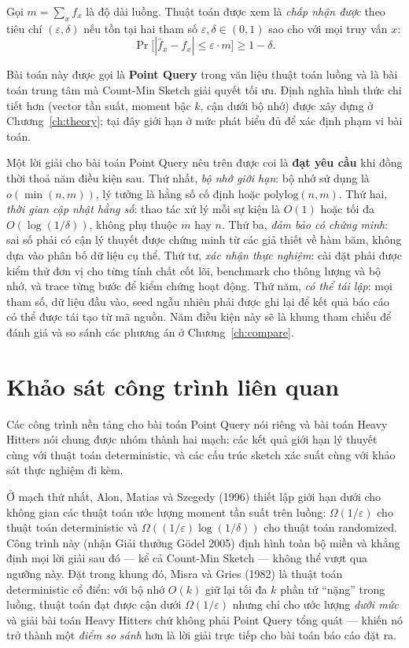 Gọi $m = \sum_x f_x$ là độ dài luồng. Thuật toán được xem là \textit{chấp nhận được} theo tiêu chí $(\varepsilon, \delta)$ nếu tồn tại hai tham số $\varepsilon, \delta \in (0, 1)$ sao cho với mọi truy vấn $x$:
\begin{equation}
\Pr\bigl[|\hat{f}_x - f_x| \le \varepsilon \cdot m\bigr] \ge 1 - \delta.
\label{eq:point-query-acceptance}
\end{equation}

Bài toán này được gọi là \textbf{Point Query} trong văn liệu thuật toán luồng và là bài toán trung tâm mà Count-Min Sketch \cite{cormode2005cms} giải quyết tối ưu. Định nghĩa hình thức chi tiết hơn (vector tần suất, moment bậc $k$, cận dưới bộ nhớ) được xây dựng ở Chương~\ref{ch:theory}; tại đây giới hạn ở mức phát biểu đủ để xác định phạm vi bài toán.

Một lời giải cho bài toán Point Query nêu trên được coi là \textbf{đạt yêu cầu} khi đồng thời thoả năm điều kiện sau. Thứ nhất, \textit{bộ nhớ giới hạn}: bộ nhớ sử dụng là $o(\min(n, m))$, lý tưởng là hằng số cố định hoặc $\mathrm{polylog}(n, m)$. Thứ hai, \textit{thời gian cập nhật hằng số}: thao tác xử lý mỗi sự kiện là $O(1)$ hoặc tối đa $O(\log(1/\delta))$, không phụ thuộc $m$ hay $n$. Thứ ba, \textit{đảm bảo có chứng minh}: sai số phải có cận lý thuyết được chứng minh từ các giả thiết về hàm băm, không dựa vào phân bố dữ liệu cụ thể. Thứ tư, \textit{xác nhận thực nghiệm}: cài đặt phải được kiểm thử đơn vị cho từng tính chất cốt lõi, benchmark cho thông lượng và bộ nhớ, và trace từng bước để kiểm chứng hoạt động. Thứ năm, \textit{có thể tái lập}: mọi tham số, dữ liệu đầu vào, seed ngẫu nhiên phải được ghi lại để kết quả báo cáo có thể được tái tạo từ mã nguồn. Năm điều kiện này sẽ là khung tham chiếu để đánh giá và so sánh các phương án ở Chương~\ref{ch:compare}.

\section{Khảo sát công trình liên quan}
\label{sec:related-work}

Các công trình nền tảng cho bài toán Point Query nói riêng và bài toán Heavy Hitters nói chung được nhóm thành hai mạch: các kết quả giới hạn lý thuyết cùng với thuật toán deterministic, và các cấu trúc sketch xác suất cùng với khảo sát thực nghiệm đi kèm.

Ở mạch thứ nhất, Alon, Matias và Szegedy (1996) \cite{alon1996space} thiết lập giới hạn dưới cho không gian các thuật toán ước lượng moment tần suất trên luồng: $\Omega(1/\varepsilon)$ cho thuật toán deterministic và $\Omega((1/\varepsilon)\log(1/\delta))$ cho thuật toán randomized. Công trình này (nhận Giải thưởng Gödel 2005) định hình toàn bộ miền và khẳng định mọi lời giải sau đó --- kể cả Count-Min Sketch --- không thể vượt qua ngưỡng này. Đặt trong khung đó, Misra và Gries (1982) \cite{misra1982finding} là thuật toán deterministic cổ điển: với bộ nhớ $O(k)$ giữ lại tối đa $k$ phần tử ``nặng'' trong luồng, thuật toán đạt được cận dưới $\Omega(1/\varepsilon)$ nhưng chỉ cho ước lượng \textit{dưới mức} và giải bài toán Heavy Hitters chứ không phải Point Query tổng quát --- khiến nó trở thành một \textit{điểm so sánh} hơn là lời giải trực tiếp cho bài toán báo cáo đặt ra.

